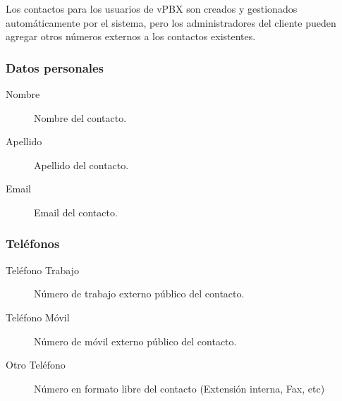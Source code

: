 \documentclass[letterpaper,10pt,spanish]{sphinxmanual}
\begin{document}
Los contactos para los usuarios de vPBX son creados y gestionados automáticamente por el sistema, pero los administradores del cliente pueden agregar otros números externos a los contactos existentes.


\subsubsection{Datos personales}
\label{administration_portal/client/vpbx/addressbook:personal-data}\begin{description}
\item[{Nombre}] \leavevmode{}\label{administration_portal/client/vpbx/addressbook:term-name}
Nombre del contacto.

\item[{Apellido}] \leavevmode{}\label{administration_portal/client/vpbx/addressbook:term-lastname}
Apellido del contacto.

\item[{Email}] \leavevmode{}\label{administration_portal/client/vpbx/addressbook:term-email}
Email del contacto.

\end{description}


\subsubsection{Teléfonos}
\label{administration_portal/client/vpbx/addressbook:phones}\begin{description}
\item[{Teléfono Trabajo}] \leavevmode{}\label{administration_portal/client/vpbx/addressbook:term-work-phone}
Número de trabajo externo público del contacto.

\item[{Teléfono Móvil}] \leavevmode{}\label{administration_portal/client/vpbx/addressbook:term-mobile-phone}
Número de móvil externo público del contacto.

\item[{Otro Teléfono}] \leavevmode{}\label{administration_portal/client/vpbx/addressbook:term-other-phone}
Número en formato libre del contacto (Extensión interna, Fax, etc)

\end{description}
\end{document}
